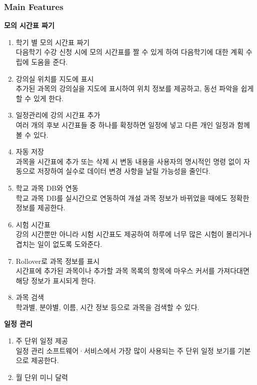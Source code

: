 \documentclass[a4paper,titlepage]{article}
\begin{document}
\subsubsection{Main Features}
\renewcommand{\theenumi}{FR.\arabic{enumi}.\arabic{enumii}}
\begin{funcreq}
	\item\textbf{모의 시간표 짜기}
	\begin{enumerate}
		\item 학기 별 모의 시간표 짜기\\
		다음학기 수강 신청 시에 모의 시간표를 짤 수 있게 하여 다음학기에 대한 계획 수립에 도움을 준다. 
		\item 강의실 위치를 지도에 표시\\
		추가된 과목의 강의실을 지도에 표시하여 위치 정보를 제공하고, 동선 파악을 쉽게 할 수 있게 한다. 
		\item 일정관리에 강의 시간표 추가\\
		여러 개의 후보 시간표들 중 하나를 확정하면 일정에 넣고 다른 개인 일정과 함께 볼 수 있다. 
		\item 자동 저장\\
		과목을 시간표에 추가 또는 삭제 시 변동 내용을 사용자의 명시적인 명령 없이 자동으로 저장하여 실수로 데이터 변경 사항을 날릴 가능성을 줄인다. 
		\item 학교 과목 DB와 연동\\
		학교 과목 DB를 실시간으로 연동하여 개설 과목 정보가 바뀌었을 때에도 정확한 정보를 제공한다. 
		\item 시험 시간표\\
		강의 시간뿐만 아니라 시험 시간표도 제공하여 하루에 너무 많은 시험이 몰리거나 겹치는 일이 없도록 도와준다. 
		\item Rollover로 과목 정보를 표시\\
		시간표에 추가된 과목이나 추가할 과목 목록의 항목에 마우스 커서를 가져다대면 해당 정보가 표시되게 한다.
		\item 과목 검색\\
		학과별, 분야별, 이름, 시간 정보 등으로 과목을 검색할 수 있다.
	\end{enumerate}
	\item\textbf{일정 관리}
	\begin{enumerate}
		\item 주 단위 일정 제공\\
		일정 관리 소프트웨어·서비스에서 가장 많이 사용되는 주 단위 일정 보기를 기본으로 제공한다. 
		\item 월 단위 미니 달력\\

\end{enumerate}
\end{funcreq}
\end{document}
